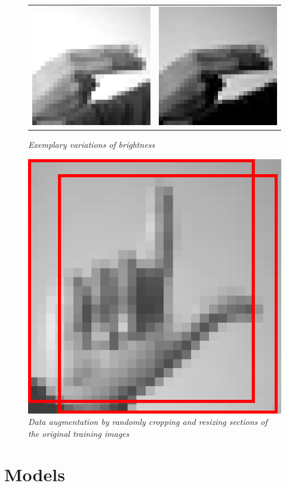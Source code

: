\documentclass[a4paper]{article}
\begin{document}
\begin{figure}
     \centering
     \begin{tabular}{cc}
          \includegraphics[width=.35\linewidth]{graphics/dataset/bright.png}&\includegraphics[width=.35\linewidth]{graphics/dataset/dark.png}
     \end{tabular}
     \caption{\textit{Exemplary variations of brightness}}
     \label{fig:brightness}
\end{figure}

\begin{figure}
     \centering
     \includegraphics[width=0.45\linewidth]{graphics/dataset/random_crop_L.png}
     \caption{\textit{Data augmentation by randomly cropping and resizing sections of the original training images}}
     \label{fig:random_crop}
\end{figure}

\section{Models}
\label{ch:models}
\end{document}
